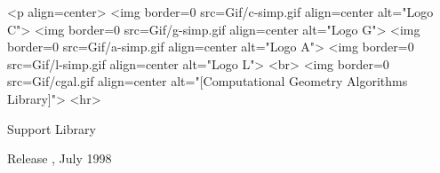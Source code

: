 
\pagestyle{empty}

\begin{titlepage}
\mbox{}
\vskip3cm

\ccTexHtml
{\centerline{
    }}
 {<p align=center>
   <img border=0 src=Gif/c-simp.gif align=center alt="Logo C">
   <img border=0 src=Gif/g-simp.gif align=center alt="Logo G">
   <img border=0 src=Gif/a-simp.gif align=center alt="Logo A">
   <img border=0 src=Gif/l-simp.gif align=center alt="Logo L">
   <br>
   <img border=0 src=Gif/cgal.gif align=center
    alt="[Computational Geometry Algorithms Library]">
    <hr>}

\vskip2cm
\centerline{ {\huge Support Library } }

\vskip2cm
\newcommand{\mydate}{July 1998}
\ccTexHtml
{\renewcommand{\mydate}{\ifcase\the\month \or January\or
    February\or March\or April\or May\or June\or July\or August\or
    September\or October\or November\or December\fi~\the\year}}{}
  \centerline{ {\large Release \cgalrelease, \mydate} }

\end{titlepage}

